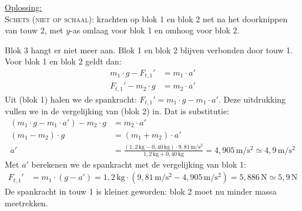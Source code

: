 \documentclass{ximera}
\newcommand{\blokje}[4][left]{\fill (#2,#3) circle (0.05); \node[#1, inner sep=3pt] at (#2,#3) {#4};}
\newcommand{\kr}[7][kracht]{\draw[#1] (#2,#3) -- ++(#4,#5) node[#6] {#7};}
\newcommand{\positiepijl}[6]{\draw[positie, draw=black!50, text=black!50] (#1,#2) -- ++(#3,#4) node[#5] {#6};}
\begin{document}
\begin{exercise}
\begin{question}
\begin{solution}
            \underline{Oplossing:}\\
            \textsc{Schets (niet op schaal):} krachten op blok 1 en blok 2 net na het doorknippen van touw 2, met $y$-as omlaag voor blok 1 en omhoog voor blok 2.
            \begin{center}
            \end{center}
            Blok 3 hangt er niet meer aan. Blok 1 en blok 2 blijven verbonden door touw 1. Voor blok 1 en blok 2 geldt dan:
            \begin{align*}
                m_{1} \cdot g - F_{t,1}' &= m_{1} \cdot a' \tag{blok 1} \\
                F_{t,1}' - m_{2} \cdot g &= m_{2} \cdot a' \tag{blok 2}
            \end{align*}
            Uit (blok 1) halen we de spankracht: $F_{t,1}' = m_{1} \cdot g - m_{1} \cdot a'$. Deze uitdrukking vullen we in de vergelijking van (blok 2) in. Dat is substitutie:
            \begin{align*}
                (m_{1} \cdot g - m_{1} \cdot a') - m_{2} \cdot g &= m_{2} \cdot a' \\
                (m_{1} - m_{2}) \cdot g &= (m_{1}+m_{2}) \cdot a' \\
                a' &= \frac{(1{,}2 \, \mathrm{kg} - 0{,}40 \, \mathrm{kg}) \cdot 9{,}81 \, \mathrm{m/s^2}}{1{,}2 \, \mathrm{kg} + 0{,}40 \, \mathrm{kg}} = 4{,}905 \, \mathrm{m/s^2} \simeq \boxed{4{,}9 \, \mathrm{m/s^2}}
            \end{align*}
            Met $a'$ berekenen we de spankracht met de vergelijking van blok 1:
            \begin{align*}
                F_{t,1}' &= m_{1} \cdot (g - a') = 1{,}2 \, \mathrm{kg} \cdot (9{,}81 \, \mathrm{m/s^2} - 4{,}905 \, \mathrm{m/s^2}) = 5{,}886 \, \mathrm{N} \simeq \boxed{5{,}9 \, \mathrm{N}}
            \end{align*}
            De spankracht in touw 1 is kleiner geworden: blok 2 moet nu minder massa meetrekken.
        \end{solution}
    \end{question}
\end{exercise}
\end{document}
